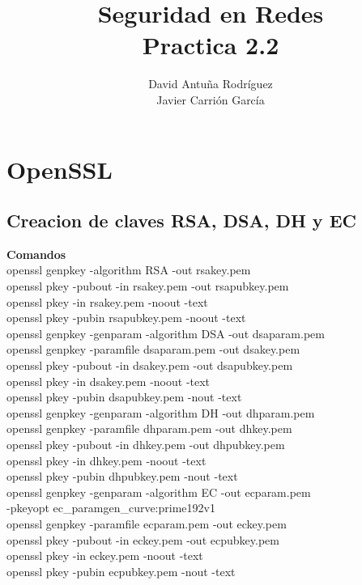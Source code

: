 \documentclass[11pt]{article}
\title{\Large Seguridad en Redes\\Practica 2.2}
\author{David Antuña Rodríguez\\Javier Carrión García}
\date{}
\begin{document}
  \raggedright

  \maketitle
  \newpage

  \section{OpenSSL}
    \subsection{Creacion de claves RSA, DSA, DH y EC}
      \par
      \textbf{Comandos}\\
      openssl genpkey -algorithm RSA -out rsakey.pem\\
      openssl pkey -pubout -in rsakey.pem -out rsapubkey.pem\\
      openssl pkey -in rsakey.pem -noout -text\\
      openssl pkey -pubin rsapubkey.pem -noout -text\\
      \vspace{2mm}
      openssl genpkey -genparam -algorithm DSA -out dsaparam.pem\\
      openssl genpkey -paramfile dsaparam.pem -out dsakey.pem\\
      openssl pkey -pubout -in dsakey.pem -out dsapubkey.pem\\
      openssl pkey -in dsakey.pem -noout -text\\
      openssl pkey -pubin dsapubkey.pem -nout -text\\
      \vspace{2mm}
      openssl genpkey -genparam -algorithm DH -out dhparam.pem\\
      openssl genpkey -paramfile dhparam.pem -out dhkey.pem\\
      openssl pkey -pubout -in dhkey.pem -out dhpubkey.pem\\
      openssl pkey -in dhkey.pem -noout -text\\
      openssl pkey -pubin dhpubkey.pem -nout -text\\
      \vspace{2mm}
      openssl genpkey -genparam -algorithm EC -out ecparam.pem\\
        \hspace{4mm}-pkeyopt ec\_paramgen\_curve:prime192v1\\
      openssl genpkey -paramfile ecparam.pem -out eckey.pem\\
      openssl pkey -pubout -in eckey.pem -out ecpubkey.pem\\
      openssl pkey -in eckey.pem -noout -text\\
      openssl pkey -pubin ecpubkey.pem -nout -text
\end{document}
